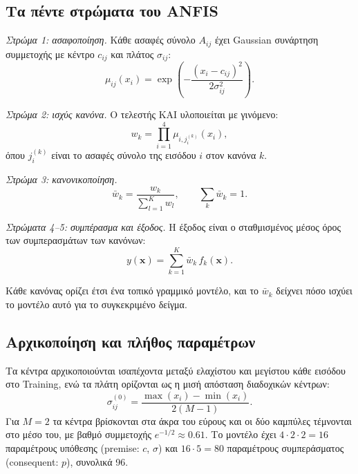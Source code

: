 \documentclass[conference]{IEEEtran}
\begin{document}
\subsection{Τα πέντε στρώματα του ANFIS}
\textit{Στρώμα 1: ασαφοποίηση.} Κάθε ασαφές σύνολο $A_{ij}$ έχει Gaussian
συνάρτηση συμμετοχής με κέντρο $c_{ij}$ και πλάτος $\sigma_{ij}$:
\begin{equation}
\mu_{ij}(x_i)=\exp\!\left(-\frac{(x_i-c_{ij})^2}{2\sigma_{ij}^2}\right).
\label{eq:mf}
\end{equation}

\textit{Στρώμα 2: ισχύς κανόνα.} Ο τελεστής ΚΑΙ υλοποιείται με γινόμενο:
\begin{equation}
w_k=\prod_{i=1}^{4}\mu_{i,j_i^{(k)}}(x_i),
\label{eq:w}
\end{equation}
όπου $j_i^{(k)}$ είναι το ασαφές σύνολο της εισόδου $i$ στον κανόνα $k$.

\textit{Στρώμα 3: κανονικοποίηση.}
\begin{equation}
\bar w_k=\frac{w_k}{\sum_{l=1}^{K} w_l}, \qquad \sum_{k}\bar w_k = 1 .
\label{eq:wn}
\end{equation}

\textit{Στρώματα 4--5: συμπέρασμα και έξοδος.} Η έξοδος είναι ο σταθμισμένος
μέσος όρος των συμπερασμάτων των κανόνων:
\begin{equation}
y(\mathbf{x})=\sum_{k=1}^{K}\bar w_k\, f_k(\mathbf{x}) .
\label{eq:out}
\end{equation}

Κάθε κανόνας ορίζει έτσι ένα τοπικό γραμμικό μοντέλο, και το $\bar w_k$
δείχνει πόσο ισχύει το μοντέλο αυτό για το συγκεκριμένο δείγμα.

\subsection{Αρχικοποίηση και πλήθος παραμέτρων}
Τα κέντρα αρχικοποιούνται ισαπέχοντα μεταξύ ελαχίστου και μεγίστου κάθε εισόδου
στο Training, ενώ τα πλάτη ορίζονται ως η μισή απόσταση διαδοχικών κέντρων:
\begin{equation}
\sigma_{ij}^{(0)}=\frac{\max(x_i)-\min(x_i)}{2(M-1)} .
\end{equation}
Για $M=2$ τα κέντρα βρίσκονται στα άκρα του εύρους και οι δύο καμπύλες
τέμνονται στο μέσο του, με βαθμό συμμετοχής $e^{-1/2}\approx0.61$. Το μοντέλο
έχει $4\cdot2\cdot2=16$ παραμέτρους υπόθεσης (premise: $c$, $\sigma$) και
$16\cdot5=80$ παραμέτρους συμπεράσματος (consequent: $p$), συνολικά 96.

\end{document}
